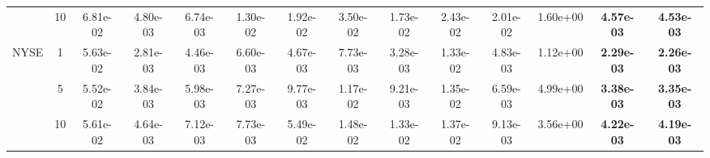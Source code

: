 \begin{table*}[!t]
{\begin{tabular}{cccccccccccccc}
 & 10 & 6.81e-02& 4.80e-03 & 6.74e-03 & 1.30e-02 & 1.92e-02& 3.50e-02& 1.73e-02 & 2.43e-02 & 2.01e-02& 1.60e+00 & \textbf{4.57e-03} & \textbf{4.53e-03}\s \\ \cmidrule(l){2-14}
\multirow{3}{*}{NYSE}& 1& 5.63e-02& 2.81e-03 & 4.46e-03 & 6.60e-03 & 4.67e-03& 7.73e-03& 3.28e-03 & 1.33e-02 & 4.83e-03& 1.12e+00 & \textbf{2.29e-03} & \textbf{2.26e-03}\s \\ \cmidrule(l){3-14}
 & 5& 5.52e-02& 3.84e-03 & 5.98e-03 & 7.27e-03 & 9.77e-03& 1.17e-02& 9.21e-03 & 1.35e-02 & 6.59e-03& 4.99e+00 & \textbf{3.38e-03} & \textbf{3.35e-03}\s \\ \cmidrule(l){3-14}
 & 10 & 5.61e-02& 4.64e-03 & 7.12e-03 & 7.73e-03 & 5.49e-02& 1.48e-02& 1.33e-02 & 1.37e-02 & 9.13e-03& 3.56e+00 & \textbf{4.22e-03} & \textbf{4.19e-03}\s \\ \bottomrule
\end{tabular}}
\end{table*}